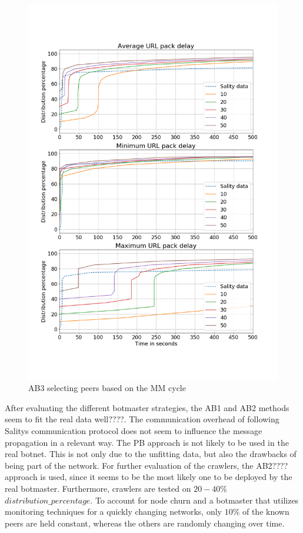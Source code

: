 \documentclass{article}
\begin{document}
\begin{figure}[H]
    \centering
    \includegraphics[width=\textwidth]{BV3-PS3.png}
    \caption{AB3 selecting peers based on the MM cycle}
    \label{fig:AB2-PS3stats}
\end{figure}

After evaluating the different botmaster strategies, the AB1 and AB2 methods seem to fit the real data well????. The communication overhead of following Salitys communication protocol does not seem to influence the message propagation in a relevant way. The PB approach is not likely to be used in the real botnet. This is not only due to the unfitting data, but also the drawbacks of being part of the network. For further evaluation of the crawlers, the AB2???? approach is used, since it seems to be the most likely one to be deployed by the real botmaster. Furthermore, crawlers are tested on $20-40\%$ $distribution\_percentage$. To account for node churn and a botmaster that utilizes monitoring techniques for a quickly changing networks, only $10\%$ of the known peers are held constant, whereas the others are randomly changing over time.
\end{document}

